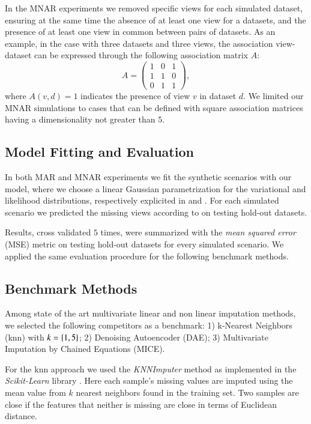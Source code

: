 In the MNAR experiments we removed specific views for each simulated dataset, ensuring at the same time the absence of at least one view for a datasets, and the presence of at least one view in common between pairs of datasets.
As an example, in the case with three datasets and three views, the association view-dataset can be expressed through the following association matrix $A$:
\begin{equation}
A = 
\begin{pmatrix}
1 & 0 & 1 \\
1 & 1 & 0 \\
0 & 1 & 1 
\end{pmatrix},
\end{equation}
where $A(v,d)=1$ indicates the presence of view $v$ in dataset $d$.
We limited our MNAR simulations to cases that can be defined with square association matrices having a dimensionality not greater than $5$.

\subsection{Model Fitting and Evaluation}

In both MAR and MNAR experiments we fit the synthetic scenarios with our model, where we choose a linear Gaussian parametrization for the variational and likelihood distributions, respectively explicited in  and .
For each simulated scenario we predicted the missing views according to  on testing hold-out datasets.

Results, cross validated $5$ times, were summarized with the \textit{mean squared error} (MSE) metric on testing hold-out datasets for every simulated scenario.
We applied the same evaluation procedure for the following benchmark methods.

\subsection{Benchmark Methods}
Among state of the art multivariate linear and non linear imputation methods, we selected the following competitors as a benchmark:
1) k-Nearest Neighbors (knn) with $k=\left\{1, 5\right\}$;
2) Denoising Autoencoder (DAE);
3) Multivariate Imputation by Chained Equations (MICE).

For the knn approach we used the \textit{KNNImputer} method as implemented in the \textit{Scikit-Learn} library \citep{sklearn}.
Here each sample's missing values are imputed using the mean value from $k$ nearest neighbors found in the training set.
Two samples are close if the features that neither is missing are close in terms of Euclidean distance.

